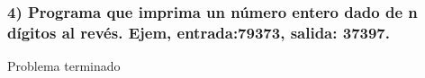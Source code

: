 \subsubsection*{4) Programa que imprima un número entero dado de n dígitos al revés. Ejem, entrada:79373, salida: 37397.}

Problema terminado